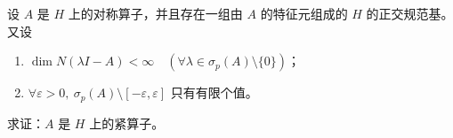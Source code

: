 \documentclass[../../main.tex]{subfiles}%
\begin{document}
\begin{example}
设 $A$ 是 $H$ 上的对称算子，并且存在一组由 $A$ 的特征元组成的 $H$ 的正交规范基。又设
\begin{enumerate}[(1)]
\item $\dim N(\lambda I - A) < \infty \quad (\forall \lambda \in \sigma_p(A)\setminus\{0\})$；
\item $\forall \varepsilon > 0,\ \sigma_p(A)\setminus[-\varepsilon,\varepsilon]$ 只有有限个值。
\end{enumerate}
求证：$A$ 是 $H$ 上的紧算子。
\end{example}
\end{document}
